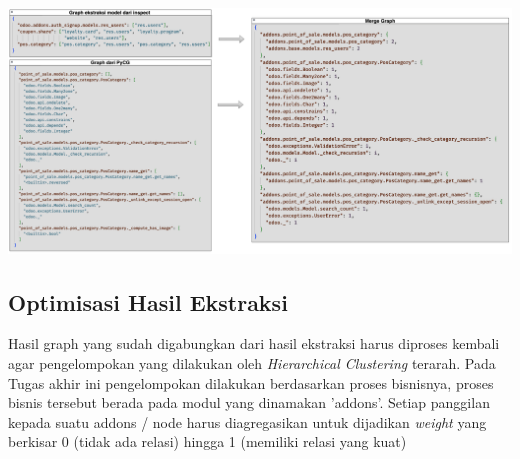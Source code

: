 \begin{center}
	\includegraphics[width=14cm]{img/bab_4/ekstraksi_5.png}
	\label{fig:ekstraksi_5}
\end{center}

\subsection{Optimisasi Hasil Ekstraksi}
Hasil graph yang sudah digabungkan dari hasil ekstraksi harus diproses kembali agar pengelompokan yang dilakukan oleh \textit{Hierarchical Clustering} terarah. Pada Tugas akhir ini pengelompokan dilakukan berdasarkan proses bisnisnya, proses bisnis tersebut berada pada modul yang dinamakan 'addons'. Setiap panggilan kepada suatu addons / node harus diagregasikan untuk dijadikan \textit{weight} yang berkisar 0 (tidak ada relasi) hingga 1 (memiliki relasi yang kuat)


